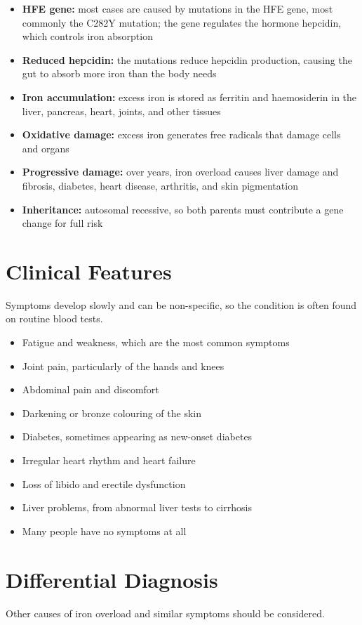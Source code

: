 \begin{itemize}
    \item \textbf{HFE gene:} most cases are caused by mutations in the HFE gene, most commonly the C282Y mutation; the gene regulates the hormone hepcidin, which controls iron absorption
    \item \textbf{Reduced hepcidin:} the mutations reduce hepcidin production, causing the gut to absorb more iron than the body needs
    \item \textbf{Iron accumulation:} excess iron is stored as ferritin and haemosiderin in the liver, pancreas, heart, joints, and other tissues
    \item \textbf{Oxidative damage:} excess iron generates free radicals that damage cells and organs
    \item \textbf{Progressive damage:} over years, iron overload causes liver damage and fibrosis, diabetes, heart disease, arthritis, and skin pigmentation
    \item \textbf{Inheritance:} autosomal recessive, so both parents must contribute a gene change for full risk
\end{itemize}

\section*{Clinical Features}
Symptoms develop slowly and can be non-specific, so the condition is often found on routine blood tests.

\begin{itemize}
    \item Fatigue and weakness, which are the most common symptoms
    \item Joint pain, particularly of the hands and knees
    \item Abdominal pain and discomfort
    \item Darkening or bronze colouring of the skin
    \item Diabetes, sometimes appearing as new-onset diabetes
    \item Irregular heart rhythm and heart failure
    \item Loss of libido and erectile dysfunction
    \item Liver problems, from abnormal liver tests to cirrhosis
    \item Many people have no symptoms at all
\end{itemize}

\section*{Differential Diagnosis}
Other causes of iron overload and similar symptoms should be considered.

